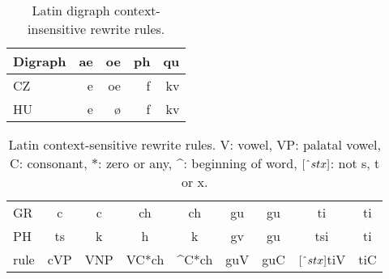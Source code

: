 \documentclass[runningheads,a4paper]{llncs}
\begin{document}
\begin{table}
	\centering
	\caption{Latin digraph context-insensitive rewrite rules.}\label{tbl:digraph}
	\begin{tabular}{l|rrrr}
	\hline
	Digraph & ae & oe & ph & qu \\
	\hline
	CZ & e & oe & f & kv \\
	HU & e & \o & f & kv \\
	\hline
	\end{tabular}
\end{table}

\begin{table}
	\centering
	\caption{Latin context-sensitive rewrite rules. V: vowel, VP: palatal vowel, C: consonant, $*$: zero or any, \string^: beginning of word, $[\string^stx]$: not s, t or x.}\label{tbl:context}
	\begin{tabular}{l|cc|cc|cc|cc}
	\hline
	GR & c & c & ch & ch & gu & gu & ti & ti \\
	PH & ts & k & h & k & gv & gu & tsi & ti \\
	\hline
	rule & \multicolumn{1}{c|}{cVP} & \multicolumn{1}{c|}{VNP} & \multicolumn{1}{c|}{VC*ch} & \multicolumn{1}{c|}{\string^C*ch} & \multicolumn{1}{c|}{guV} & \multicolumn{1}{c|}{guC} & \multicolumn{1}{c|}{$[\string^stx]$tiV} & \multicolumn{1}{c|}{tiC} \\
	\hline
	\end{tabular}
\end{table}

\end{document}
